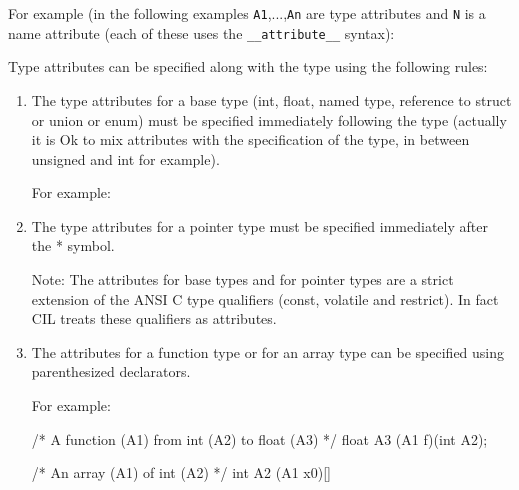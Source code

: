 \documentclass{article}
\def\t#1{{\tt #1}}
\begin{document}
 For example (in the following examples \t{A1},...,\t{An} are type attributes
and \t{N} is a name attribute (each of these uses the \t{\_\_attribute\_\_} syntax):



 Type attributes can be specified along with the type using the following
 rules: 
\begin{enumerate}
 \item The type attributes for a base type (int, float, named type, reference
    to struct or union or enum) must be specified immediately following the
    type (actually it is Ok to mix attributes with the specification of the
    type, in between unsigned and int for example).

  For example:
 
 \item The type attributes for a pointer type must be specified immediately
 after the * symbol.


 Note: The attributes for base types and for pointer types are a strict
 extension of the ANSI C type qualifiers (const, volatile and restrict). In
 fact CIL treats these qualifiers as attributes. 

  \item The attributes for a function type or for an array type can be
     specified using parenthesized declarators.

   For example:
\begin{code}
   /* A function (A1) from int (A2) to float (A3) */
   float A3 (A1 f)(int A2);

   /* An array (A1) of int (A2) */
   int A2 (A1 x0)[]


\end{code}
\end{enumerate}
\end{document}

